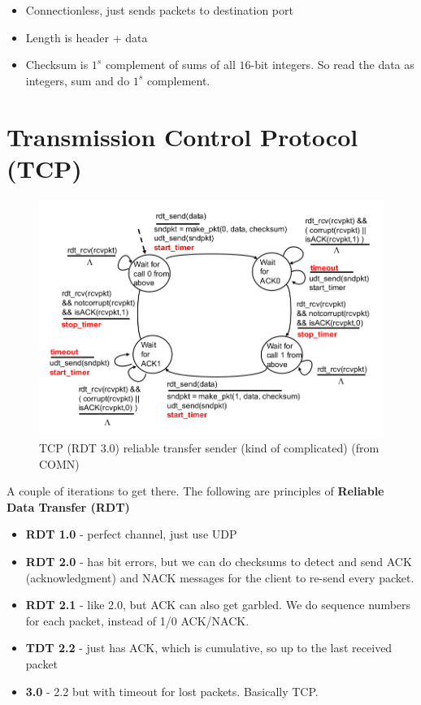 \documentclass{article}
\begin{document}
\begin{itemize}
    \item Connectionless, just sends packets to destination port
    \item Length is header + data
    \item Checksum is $1^s$ complement of sums of all $16$-bit integers. So read the data as integers, sum and do $1^s$ complement.
\end{itemize}

\section{Transmission Control Protocol (TCP)}
\begin{figure}
    \centering
    \includegraphics[width=1\textwidth]{figures/tcp.png}
    \caption{TCP (RDT 3.0) reliable transfer sender (kind of complicated) (from COMN)}
    \label{fig:udp}
\end{figure}

A couple of iterations to get there. The following are principles of \textbf{Reliable Data Transfer (RDT)}
\begin{itemize}
    \item \textbf{RDT 1.0} - perfect channel, just use UDP
    \item \textbf{RDT 2.0} - has bit errors, but we can do checksums to detect and send ACK (acknowledgment) and NACK messages for the client to re-send every packet.
    \item \textbf{RDT 2.1} - like 2.0, but ACK can also get garbled. We do sequence numbers for each packet, instead of 1/0 ACK/NACK.
    \item \textbf{TDT 2.2} - just has ACK, which is cumulative, so up to the last received packet
    \item \textbf{3.0} - 2.2 but with timeout for lost packets. Basically TCP.
\end{itemize}
\end{document}
